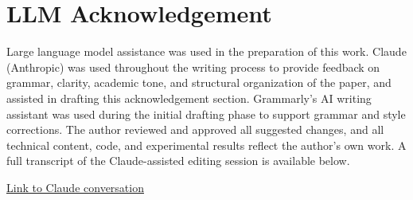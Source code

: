 \documentclass{article}
\begin{document}



\appendix
\section*{LLM Acknowledgement}
Large language model assistance was used in the preparation of this work. Claude (Anthropic) was used throughout the writing process to provide feedback on grammar, clarity, academic tone, and structural organization of the paper, and assisted in drafting this acknowledgement section. Grammarly's AI writing assistant was used during the initial drafting phase to support grammar and style corrections. The author reviewed and approved all suggested changes, and all technical content, code, and experimental results reflect the author's own work. A full transcript of the Claude-assisted editing session is available below.
\begin{center}
    \href{https://claude.ai/chat/8d8c36b4-2fe5-4fe7-ad06-7cf96ae51a00}{Link to Claude conversation}
\end{center}
\end{document}
